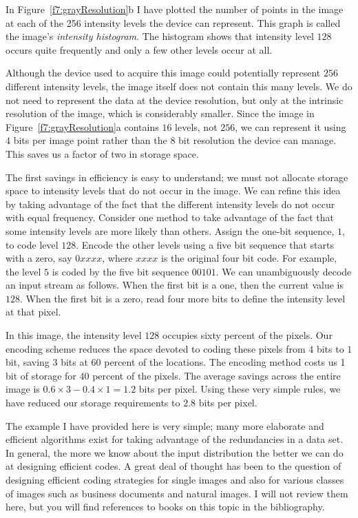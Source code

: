 In Figure~\ref{f7:grayResolution}b I have plotted the number of points
in the image at each of the 256 intensity levels the device can
represent.  This graph is called the image's {\em intensity
histogram}.  The histogram shows that intensity level $128$ occurs
quite frequently and only a few other levels occur at all.

Although the device used to acquire this image could potentially
represent $256$ different intensity levels, the image itself does not
contain this many levels.  We do not need to represent the data at the
device resolution, but only at the intrinsic resolution of the image,
which is considerably smaller.  Since the image in
Figure~\ref{f7:grayResolution}a contains $16$ levels, not $256$, we
can represent it using $4$ bits per image point rather than the $8$
bit resolution the device can manage.  This saves us a factor of two
in storage space.

The first savings in efficiency is easy to understand; we must not
allocate storage space to intensity levels that do not occur in the
image.  We can refine this idea by taking advantage of the fact that
the different intensity levels do not occur with equal frequency.
Consider one method to take advantage of the fact that some intensity
levels are more likely than others.  Assign the one-bit sequence, $1$,
to code level $128$.  Encode the other levels using a five bit
sequence that starts with a zero, say $0xxxx$, where $xxxx$ is the
original four bit code.  For example, the level $5$ is coded by the
five bit sequence $00101$.  We can unambiguously decode an input
stream as follows.  When the first bit is a one, then the current
value is $128$.  When the first bit is a zero, read four more bits to
define the intensity level at that pixel.

In this image, the intensity level $128$ occupies sixty percent of the
pixels.  Our encoding scheme reduces the space devoted to coding these
pixels from $4$ bits to $1$ bit, saving $3$ bits at $60$ percent of
the locations.  The encoding method costs us 1 bit of storage for 40
percent of the pixels.  The average savings across the entire image is
$0.6 \times 3 - 0.4 \times 1 = 1.2$ bits per pixel.  Using these very
simple rules, we have reduced our storage requirements to $2.8$ bits
per pixel.

The example I have provided here is very simple; many more elaborate
and efficient algorithms exist for taking advantage of the
redundancies in a data set.  In general, the more we know about the
input distribution the better we can do at designing efficient codes.
A great deal of thought has been to the question of designing
efficient coding strategies for single images and also for various
classes of images such as business documents and natural images.  I
will not review them here, but you will find references to books on
this topic in the bibliography.

